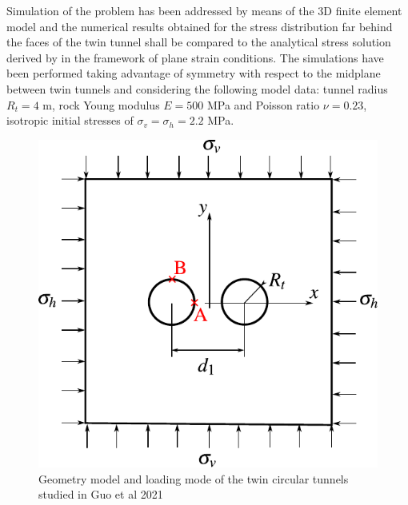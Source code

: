 \documentclass[Journal,letterpaper, NoLists,SectionNumbers]{ascelike-new}
\begin{document}
Simulation of the problem has been addressed by means of the 3D finite element model and the numerical results obtained for the stress distribution far behind the faces of the twin tunnel shall be compared to the analytical stress solution derived by  in the framework of plane strain conditions. The simulations have been performed taking advantage of symmetry with respect to the midplane between twin tunnels and considering the following model data: tunnel radius $R_t = 4$ m, rock Young modulus $E = 500$ MPa and Poisson ratio $\nu = 0.23$, isotropic initial stresses of $\sigma_v = \sigma_h = 2.2$ MPa.
\begin{figure}[h!]
	\centering
	\includegraphics[scale=0.7]{GUO_FIG0.pdf}
	\caption{Geometry model and loading mode of the twin circular tunnels studied in Guo et al 2021}
	\label{GUO_FIG0}
\end{figure}
\end{document}
